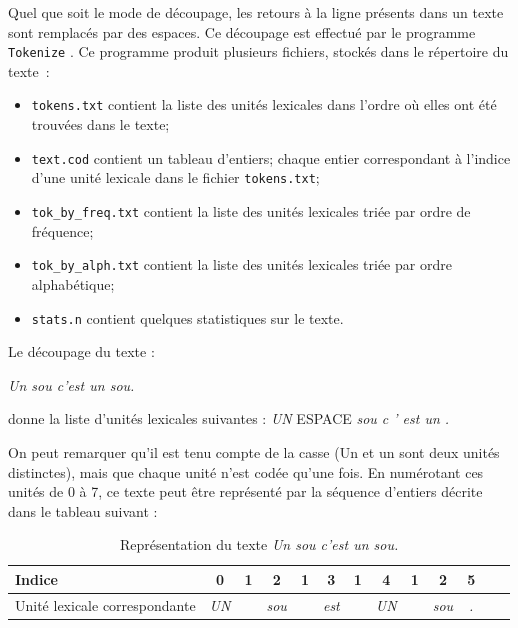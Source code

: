 \bigskip
\noindent Quel que soit le mode de découpage, les retours à la ligne présents
dans un texte sont remplacés par des espaces. Ce découpage est effectué par le programme
\verb+Tokenize+ .
Ce programme produit plusieurs fichiers, stockés dans le répertoire du texte~:
\begin{itemize}
  \item \verb+tokens.txt+ contient la liste des unités lexicales dans l’ordre où elles ont été
  	  trouvées dans le texte;
  \item \verb+text.cod+  contient un tableau d’entiers; chaque entier correspondant à l’indice d’une
  	  unité lexicale dans le fichier \verb+tokens.txt+;
  \item \verb+tok_by_freq.txt+ contient la liste des unités lexicales triée par ordre de fréquence;
  \item \verb+tok_by_alph.txt+ contient la liste des unités lexicales triée par ordre alphabétique;
\item \verb+stats.n+ contient quelques statistiques sur le texte. 
\end{itemize}

\bigskip
\noindent Le découpage du texte :

\bigskip
\textit{Un sou c’est un sou.}

\bigskip
\noindent donne la liste d’unités lexicales suivantes :  \textit{UN} ESPACE \textit{sou c ’ est un
.}

\bigskip
\noindent On peut remarquer qu’il est tenu compte de la casse (Un et un sont deux unités distinctes), mais que chaque unité n’est codée qu’une fois. En numérotant ces unités de 0 à 7,
ce texte peut être représenté par la séquence d’entiers décrite dans le tableau suivant :

\bigskip
\begin{table}[!ht]
\begin{center}
\begin{tabular}{|p{2.8cm}||c|c|c|c|c|c|c|c|c|c|c|c|}
\hline
Indice             & 0 & 1 & 2 & 1 & 3 & 1 & 4 & 1 & 2 & 5
\\
\hline
Unité lexicale correspondante & \textit{UN} &   & \textit{sou} &   & \textit{est} &  & \textit{UN}
& & \textit{sou} & \textit{.}
\\
\hline
\end{tabular}
\caption{Représentation du texte \textit{Un sou c’est un sou.}}
\end{center}
\end{table}

